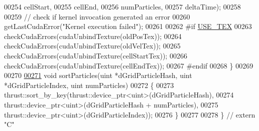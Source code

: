 \begin{DoxyCode}
00254                                               cellStart,
00255                                               cellEnd,
00256                                               numParticles,
00257                                                                                           deltaTime);
00258 
00259         \textcolor{comment}{// check if kernel invocation generated an error}
00260         getLastCudaError(\textcolor{stringliteral}{"Kernel execution failed"});
00261 
00262 \textcolor{preprocessor}{#}\textcolor{preprocessor}{if} \hyperlink{particles__kernel_8cuh_a0ab211ca35e2616c721fcf2dd4f99c83}{USE\_TEX}
00263         checkCudaErrors(cudaUnbindTexture(oldPosTex));
00264         checkCudaErrors(cudaUnbindTexture(oldVelTex));
00265         checkCudaErrors(cudaUnbindTexture(cellStartTex));
00266         checkCudaErrors(cudaUnbindTexture(cellEndTex));
00267 \textcolor{preprocessor}{#}\textcolor{preprocessor}{endif}
00268     \}
00269 
00270 
\hypertarget{particle_system__cuda_8cu_source_l00271}{}\hyperlink{particle_system__cuda_8cu_ac71da7e4672a2732a098ba933a799257}{00271}     \textcolor{keywordtype}{void} sortParticles(uint *dGridParticleHash, uint *dGridParticleIndex, uint numParticles)
00272     \{
00273         thrust::sort\_by\_key(thrust::device\_ptr<uint>(dGridParticleHash),
00274                             thrust::device\_ptr<uint>(dGridParticleHash + numParticles),
00275                             thrust::device\_ptr<uint>(dGridParticleIndex));
00276     \}
00277 
00278 \}   \textcolor{comment}{// extern "C"}
\end{DoxyCode}
